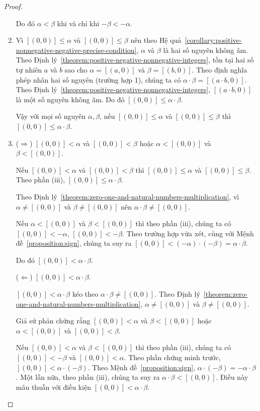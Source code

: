 \begin{proof}
\begin{enumerate}[label={(\roman*)}]
		      Do đó $\alpha < \beta$ khi và chỉ khi $-\beta < -\alpha$.
		\item Vì $[(0,0)]\leq\alpha$ và $[(0,0)]\leq\beta$ nên theo Hệ quả~\ref{corollary:positive-nonnegative-negative-precise-condition}, $\alpha$ và $\beta$ là hai số nguyên không âm. Theo Định lý~\ref{theorem:positive-negative-nonnegative-integers}, tồn tại hai số tự nhiên $a$ và $b$ sao cho $\alpha = [(a, 0)]$ và $\beta = [(b, 0)]$. Theo định nghĩa phép nhân hai số nguyên (trường hợp 1), chúng ta có $\alpha\cdot\beta = [(a\cdot b, 0)]$. Theo Định lý~\ref{theorem:positive-negative-nonnegative-integers}, $[(a\cdot b, 0)]$ là một số nguyên không âm. Do đó $[(0, 0)]\leq\alpha\cdot\beta$.

		      Vậy với mọi số nguyên $\alpha, \beta$, nếu $[(0,0)]\leq \alpha$ và $[(0,0)]\leq \beta$ thì $[(0,0)]\leq \alpha\cdot \beta$.
		\item ($\Rightarrow$) $[(0,0)] < \alpha$ và $[(0,0)] < \beta$ hoặc $\alpha < [(0,0)]$ và $\beta < [(0,0)]$.

		      Nếu $[(0,0)] < \alpha$ và $[(0,0)] < \beta$ thì $[(0,0)]\leq \alpha$ và $[(0,0)]\leq \beta$. Theo phần (iii), $[(0,0)] \leq \alpha\cdot\beta$.

		      Theo Định lý~\ref{theorem:zero-one-and-natural-numbers-multiplication}, vì $\alpha\ne [(0,0)]$ và $\beta\ne[(0,0)]$ nên $\alpha\cdot\beta \ne [(0,0)]$.

		      Nếu $\alpha < [(0,0)]$ và $\beta < [(0,0)]$ thì theo phần (iii), chúng ta có $[(0,0)] < -\alpha$, $[(0,0)] < -\beta$. Theo trường hợp vừa xét, cùng với Mệnh đề~\ref{proposition:sign}, chúng ta suy ra $[(0, 0)] < (-\alpha)\cdot(-\beta) = \alpha\cdot\beta$.

		      Do đó $[(0,0)] < \alpha\cdot\beta$.

		      ($\Leftarrow$) $[(0,0)] < \alpha\cdot\beta$.

		      $[(0,0)] < \alpha\cdot\beta$ kéo theo $\alpha\cdot\beta \ne [(0,0)]$. Theo Định lý~\ref{theorem:zero-one-and-natural-numbers-multiplication}, $\alpha\ne [(0,0)]$ và $\beta\ne [(0,0)]$.

		      Giả sử phản chứng rằng $[(0,0)] < \alpha$ và $\beta < [(0,0)]$ hoặc $\alpha < [(0,0)]$ và $[(0,0)] < \beta$.

		      Nếu $[(0,0)] < \alpha$ và $\beta < [(0,0)]$ thì theo phần (iii), chúng ta có $[(0,0)] < -\beta$ và $[(0,0)] < \alpha$. Theo phần chứng minh trước, $[(0,0)] < \alpha\cdot(-\beta)$. Theo Mệnh đề~\ref{proposition:sign}, $\alpha\cdot(-\beta) = -\alpha\cdot\beta$. Một lần nữa, theo phần (iii), chúng ta suy ra $\alpha\cdot\beta < [(0,0)]$. Điều này mâu thuẫn với điều kiện $[(0,0)] < \alpha\cdot\beta$.


\end{enumerate}
\end{proof}
